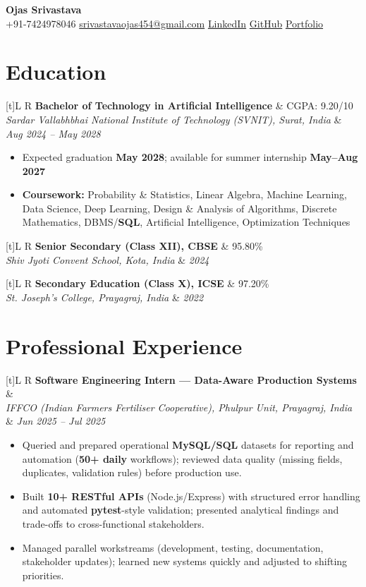 \documentclass[a4paper,10pt]{article}
\newcommand{\resumeSubheading}[4]{%
  \vspace{0.3mm}
  \noindent
  \begin{tabularx}{\textwidth}[t]{L R}
    \textbf{#1} & #4 \\
    \textit{#3} & \textit{#2} \\
  \end{tabularx}
  \vspace{-0.3mm}%
}
\begin{document}
\selectfont

\begin{center}
  {\LARGE \textbf{Ojas Srivastava}} \\[0.55mm]
  \small
  +91-7424978046 \textbar{}
  \href{mailto:srivastavaojas454@gmail.com}{srivastavaojas454@gmail.com} \textbar{}
  \href{https://linkedin.com/in/ojas-srivastava05}{LinkedIn} \textbar{}
  \href{https://github.com/Ojas-Srivastava05}{GitHub} \textbar{}
  \href{https://ojas-srivastava.vercel.app}{Portfolio}
\end{center}

\vspace{-0.5mm}

\section{Education}
\small
\resumeSubheading
  {Bachelor of Technology in Artificial Intelligence}{Aug 2024 -- May 2028}
  {Sardar Vallabhbhai National Institute of Technology (SVNIT), Surat, India}{CGPA: 9.20/10}
\begin{itemize}
  \item Expected graduation \textbf{May 2028}; available for summer internship \textbf{May--Aug 2027}
  \item \textbf{Coursework:} Probability \& Statistics, Linear Algebra, Machine Learning, Data Science, Deep Learning, Design \& Analysis of Algorithms, Discrete Mathematics, DBMS/\textbf{SQL}, Artificial Intelligence, Optimization Techniques
\end{itemize}

\resumeSubheading
  {Senior Secondary (Class XII), CBSE}{2024}
  {Shiv Jyoti Convent School, Kota, India}{95.80\%}

\resumeSubheading
  {Secondary Education (Class X), ICSE}{2022}
  {St. Joseph's College, Prayagraj, India}{97.20\%}

\section{Professional Experience}
\small
\resumeSubheading
  {Software Engineering Intern --- Data-Aware Production Systems}{Jun 2025 -- Jul 2025}
  {IFFCO (Indian Farmers Fertiliser Cooperative), Phulpur Unit, Prayagraj, India}{}
\begin{itemize}
  \item Queried and prepared operational \textbf{MySQL/SQL} datasets for reporting and automation (\textbf{50+ daily} workflows); reviewed data quality (missing fields, duplicates, validation rules) before production use.
  \item Built \textbf{10+ RESTful APIs} (Node.js/Express) with structured error handling and automated \textbf{pytest}-style validation; presented analytical findings and trade-offs to cross-functional stakeholders.
  \item Managed parallel workstreams (development, testing, documentation, stakeholder updates); learned new systems quickly and adjusted to shifting priorities.
\end{itemize}
\end{document}
